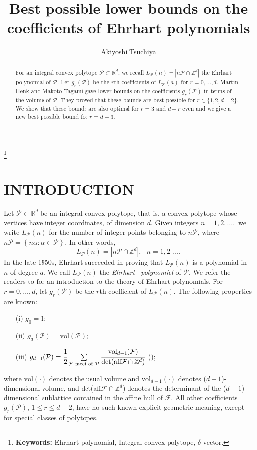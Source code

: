 \documentclass[12pt]{amsart}
\theoremstyle{definition}
\theoremstyle{remark}
\numberwithin{equation}{section}
\def\Fc{{\mathcal F}}
\def\Pc{{\mathcal P}}
\def\NZQ{\mathbb}               %
\def\ZZ{{\NZQ Z}}
\def\RR{{\NZQ R}}
\begin{document}
	\title{Best possible lower bounds on the coefficients of Ehrhart polynomials}
	\author{Akiyoshi Tsuchiya}
	\thanks{
		{\bf Keywords:}
		Ehrhart polynomial, Integral convex polytope, $\delta$-vector.
	}
	\address{Akiyoshi Tsuchiya,
		Department of Pure and Applied Mathematics,
		Graduate School of Information Science and Technology,
		Osaka University,
		Toyonaka, Osaka 560-0043, Japan}
	\begin{abstract}
		For an integral convex polytope $\Pc \subset \RR^d$, we recall  $L_\Pc(n)=|n\Pc \cap  \ZZ^d|$ the Ehrhart polynomial of $\Pc$.
		Let $g_r(\Pc)$ be the $r$th coefficients of $L_\Pc(n)$ for $r=0,\ldots,d$.
		Martin Henk and Makoto Tagami gave lower bounds on the coefficients $g_r(\Pc)$ in terms of the volume of $\Pc$.
    	They proved that these bounds are best possible for $r \in \{1,2,d-2\}$.
    	We show that these bounds are also optimal for $r=3$ and $d-r$ even and we give a new best possible bound for $r=d-3$.
	\end{abstract}
	\maketitle
	\section*{INTRODUCTION}
	Let $\Pc \subset \RR^d$ be an integral convex polytope, that is, a convex polytope whose vertices have integer coordinates, of dimension $d$.
	Given integers $n=1,2,\ldots,$ we write $L_\Pc(n)$ 
	for the number of integer points belonging to $n\Pc$, 
	where $n\Pc=\left\{n\alpha : \alpha \in \Pc \right\}$.
	In other words,
	$$L_\Pc(n)=|n\Pc \cap  \ZZ^d|, \ \ \ n=1,2,\ldots .$$
	In the late 1950s, Ehrhart succeeded in proving that $L_\Pc(n)$ 
	is a polynomial in $n$ of degree $d$.
	We call $L_\Pc(n)$ the \textit{Ehrhart \ polynomial} of $\Pc$.
	We refer the readers to \cite{Beck,Ehrhart,Hibi}  for an introduction to the theory of Ehrhart polynomials.
    For $r=0,\ldots,d$, let $g_r(\Pc)$ be the $r$th coefficient of $L_\Pc(n)$.
	The following properties are known:
	\begin{itemize}	
		\item[(i)] $g_0=1$;
		\item[(ii)] $g_d(\Pc)=\text{vol}(\Pc)$;
		\item[(iii)] $g_{d-1}(\Pc)=\cfrac{1}{2}\sum\limits_{\Fc \ \text{facet of} \ \Pc}\cfrac{\text{vol}_{d-1}(\Fc)}{\text{det}(\text{aff}\Fc \cap \ZZ^d)}$ (\cite[Theorem 5.6]{Beck});
	\end{itemize}
	where $\text{vol}(\cdot)$ denotes the usual volume and $\text{vol}_{d-1}(\cdot)$ denotes ($d-1$)-dimensional volume,
	and det(aff$\Fc \cap \ZZ^d$) denotes the determinant of the ($d-1$)-dimensional sublattice contained in the affine hull of  $\Fc$.
    All other coefficients $g_r(\Pc)$, $1\leq r \leq d-2 $, have no such known explicit geometric meaning, except for special classes of  polytopes.  
 
\end{document}
